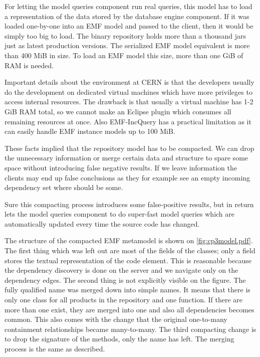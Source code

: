 For letting the model queries component run real queries, this model has to load
a representation of the data stored by the database engine component. If it was
loaded one-by-one into an EMF model and passed to the client, then it would be
simply too big to load. The binary repository holds more than a thousand jars
just as latest production versions. The serialized EMF model equivalent is more
than 400 MiB in size. To load an EMF model this size, more than one GiB  of
RAM is needed.

Important details about the environment at CERN is that the developers usually
do the development on dedicated virtual machines which have more privileges to
access internal resources. The drawback is that usually a virtual machine has
1-2 GiB RAM total, so we cannot make an Eclipse plugin which consumes all
remaining resources at once. Also EMF-IncQuery has a practical limitation as it
can easily handle EMF instance models up to 100 MiB.

These facts implied that the repository model has to be compacted. We can drop
the unnecessary information or merge certain data and structure to spare some
space without introducing false negative results. If we leave information the
clients may end up false conclusions as they for example see an empty incoming
dependency set where should be some. 

Sure this compacting process introduces some false-positive results, but in 
return lets the model queries component to do super-fast model queries which
are automatically updated every time the source code has changed. 

The structure of the compacted EMF metamodel is shown on \autoref{fig:cp3model.pdf}.
The first thing which was left out are most of the fields of the classes; only a
 field stores the textual representation of the code element. This is
reasonable because the dependency discovery is done on the server and we
navigate only on the dependency edges. The second thing is not explicitly
visible on the figure. The fully qualified name was merged down into simple
names. It means that there is only one  class for all products in
the repository and one  function. If there are more than one
exist, they are merged into one and also all dependencies becomes common. This
also comes with the change that the original one-to-many containment
relationships became many-to-many. The third compacting change is to drop the
signature of the methods, only the name has left. The merging process is the
same as described.

